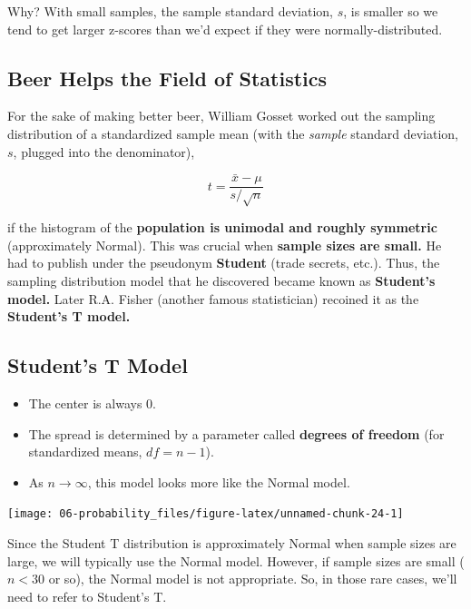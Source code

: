 \documentclass[
]{book}
\providecommand{\tightlist}{%
  \setlength{\itemsep}{0pt}\setlength{\parskip}{0pt}}
\begin{document}
Why? With small samples, the sample standard deviation, \(s\), is smaller so we tend to get larger z-scores than we'd expect if they were normally-distributed.

\hypertarget{beer-helps-the-field-of-statistics}{%
\subsection{Beer Helps the Field of Statistics}\label{beer-helps-the-field-of-statistics}}

For the sake of making better beer, William Gosset worked out the sampling distribution of a standardized sample mean (with the \emph{sample} standard deviation, \(s\), plugged into the denominator),

\[t = \frac{\bar{x} - \mu}{s/\sqrt{n}}\]

if the histogram of the \textbf{population is unimodal and roughly symmetric} (approximately Normal). This was crucial when \textbf{sample sizes are small.} He had to publish under the pseudonym \textbf{Student} (trade secrets, etc.). Thus, the sampling distribution model that he discovered became known as \textbf{Student's model.} Later R.A. Fisher (another famous statistician) recoined it as the \textbf{Student's T model.}

\hypertarget{students-t-model}{%
\subsection{Student's T Model}\label{students-t-model}}

\begin{itemize}
\tightlist
\item
  The center is always 0.
\item
  The spread is determined by a parameter called \textbf{degrees of freedom} (for standardized means, \(df = n - 1\)).
\item
  As \(n\rightarrow\infty\), this model looks more like the Normal model.
\end{itemize}

\begin{center}\texttt{[image: 06-probability\_files/figure-latex/unnamed-chunk-24-1]} \end{center}

Since the Student T distribution is approximately Normal when sample sizes are large, we will typically use the Normal model. However, if sample sizes are small (\(n<30\) or so), the Normal model is not appropriate. So, in those rare cases, we'll need to refer to Student's T.
\end{document}
